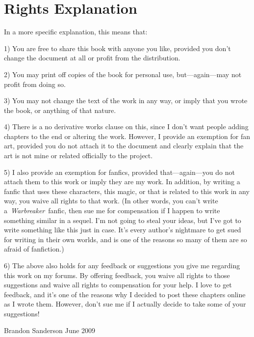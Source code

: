 \section{Rights Explanation}

In a more specific explanation, this means that:

1) You are free to share this book with anyone you like, provided you don’t change the document at all or profit from the distribution.

2) You may print off copies of the book for personal use, but—again—may not profit from doing so.

3) You may not change the text of the work in any way, or imply that you wrote the book, or anything of that nature.

4) There is a no derivative works clause on this, since I don’t want people adding chapters to the end or altering the work. However, I provide an exemption for fan art, provided you do not attach it to the document and clearly explain that the art is not mine or related officially to the project.

5) I also provide an exemption for fanfics, provided that—again—you do not attach them to this work or imply they are my work. In addition, by writing a fanfic that uses these characters, this magic, or that is related to this work in any way, you waive all rights to that work. (In other words, you can’t write a~\textit{Warbreaker}~fanfic, then sue me for compensation if I happen to write something similar in a sequel. I’m not going to steal your ideas, but I’ve got to write something like this just in case. It’s every author’s nightmare to get sued for writing in their own worlds, and is one of the reasons so many of them are so afraid of fanfiction.)

6) The above also holds for any feedback or suggestions you give me regarding this work on my forums. By offering feedback, you waive all rights to those suggestions and waive all rights to compensation for your help. I love to get feedback, and it’s one of the reasons why I decided to post these chapters online as I wrote them. However, don’t sue me if I actually decide to take some of your suggestions!

Brandon Sanderson
June 2009

